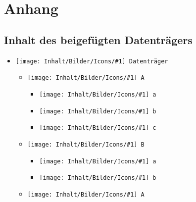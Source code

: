 \appendix
%
\chapter{Anhang}
\label{chap:Anhang}
%
\section{Inhalt des beigefügten Datenträgers}
\label{sec:Inhalt des beigefügten Datenträgers}
%
\newcommand{\itemCustom}[1]{\item[] \texttt{[image: Inhalt/Bilder/Icons/\#1]}~}
\newcommand{\itemPDF}{\itemCustom{application-pdf}}
\newcommand{\itemFolder}{\itemCustom{folder-yellow}}
\newcommand{\itemDatei}{\itemCustom{Datei}}
\newcommand{\itemDisc}{\itemCustom{media-optical}\texttt}
%
\begin{itemize}
	\itemDisc \texttt{Datenträger}
	\begin{itemize}
		\itemFolder \texttt{A}
		\begin{itemize}
			\itemFolder \texttt{a}
			\itemFolder \texttt{b}
			\itemFolder \texttt{c}
		\end{itemize}
	\end{itemize}
	\begin{itemize}
		\itemFolder \texttt{B}
		\begin{itemize}
			\itemFolder \texttt{a}
			\itemFolder \texttt{b}
		\end{itemize}
	\end{itemize}
	\begin{itemize}
		\itemPDF \texttt{A}
	\end{itemize}
\end{itemize}
%
\let\itemCustom\undefined
\let\itemPDF\undefined
\let\itemFolder\undefined
\let\itemDisc\undefined
%